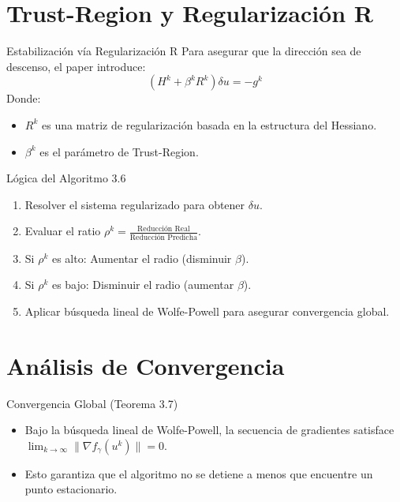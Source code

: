 \documentclass[10pt, aspectratio=169, xcolor={dvipsnames}]{beamer}
\begin{document}
\section{Trust-Region y Regularización R}

\begin{frame}{Estabilización vía Regularización R}
    Para asegurar que la dirección sea de descenso, el paper introduce:
    \[ (H^k + \beta^k R^k) \delta u = -g^k \]
    Donde:
    \begin{itemize}
        \item $R^k$ es una matriz de regularización basada en la estructura del Hessiano.
        \item $\beta^k$ es el parámetro de Trust-Region.
    \end{itemize}
\end{frame}

\begin{frame}{Lógica del Algoritmo 3.6}
    \begin{enumerate}
        \item Resolver el sistema regularizado para obtener $\delta u$.
        \item Evaluar el ratio $\rho^k = \frac{\text{Reducción Real}}{\text{Reducción Predicha}}$.
        \item Si $\rho^k$ es alto: Aumentar el radio (disminuir $\beta$).
        \item Si $\rho^k$ es bajo: Disminuir el radio (aumentar $\beta$).
        \item Aplicar búsqueda lineal de Wolfe-Powell para asegurar convergencia global.
    \end{enumerate}
\end{frame}

\section{Análisis de Convergencia}

\begin{frame}{Convergencia Global (Teorema 3.7)}
    \begin{itemize}
        \item Bajo la búsqueda lineal de Wolfe-Powell, la secuencia de gradientes satisface $\lim_{k\to\infty} \|\nabla f_\gamma(u^k)\| = 0$.
        \item Esto garantiza que el algoritmo no se detiene a menos que encuentre un punto estacionario.
    \end{itemize}
\end{frame}
\end{document}
